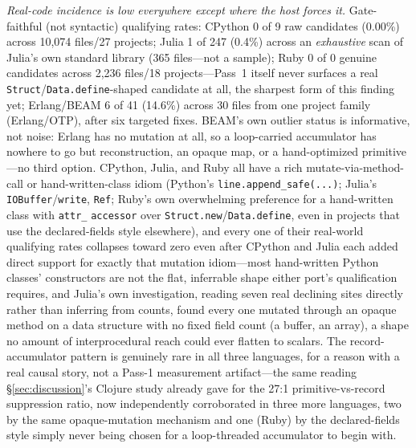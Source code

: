 \documentclass[sigplan,screen,review,anonymous]{acmart}
\begin{document}
\emph{Real-code incidence is low everywhere except where the host forces
it.} Gate-faithful (not syntactic) qualifying rates: CPython 0 of 9 raw
candidates (0.00\%) across 10{,}074 files/27 projects; Julia 1 of 247
(0.4\%) across an \emph{exhaustive} scan of Julia's own standard library
(365 files---not a sample); Ruby 0 of 0 genuine candidates across 2{,}236
files/18 projects---Pass~1 itself never surfaces a real
\texttt{Struct}/\texttt{Data.define}-shaped candidate at all, the
sharpest form of this finding yet; Erlang/BEAM 6 of 41 (14.6\%) across 30
files from one project family (Erlang/OTP), after six targeted fixes.
BEAM's own outlier status is informative, not noise: Erlang has no
mutation at all, so a loop-carried accumulator has nowhere to go but
reconstruction, an opaque map, or a hand-optimized primitive---no third
option. CPython, Julia, and Ruby all have a rich mutate-via-method-call
or hand-written-class idiom (Python's \texttt{line.append\_safe(...)};
Julia's \texttt{IOBuffer}/\texttt{write}, \texttt{Ref}; Ruby's own
overwhelming preference for a hand-written class with \texttt{attr\_}
\texttt{accessor} over \texttt{Struct.new}/\texttt{Data.define}, even in
projects that use the declared-fields style elsewhere), and every one of
their real-world qualifying rates collapses toward zero even after
CPython and Julia each added direct support for exactly that mutation
idiom---most hand-written Python classes' constructors are not the flat,
inferrable shape either port's qualification requires, and Julia's own
investigation, reading seven real declining sites directly rather than
inferring from counts, found every one mutated through an opaque method
on a data structure with no fixed field count (a buffer, an array), a
shape no amount of interprocedural reach could ever flatten to scalars.
The record-accumulator pattern is genuinely rare in all three languages,
for a reason with a real causal story, not a Pass-1 measurement
artifact---the same reading \S\ref{sec:discussion}'s Clojure study
already gave for the 27:1 primitive-vs-record suppression ratio, now
independently corroborated in three more languages, two by the same
opaque-mutation mechanism and one (Ruby) by the declared-fields style
simply never being chosen for a loop-threaded accumulator to begin with.
\end{document}
